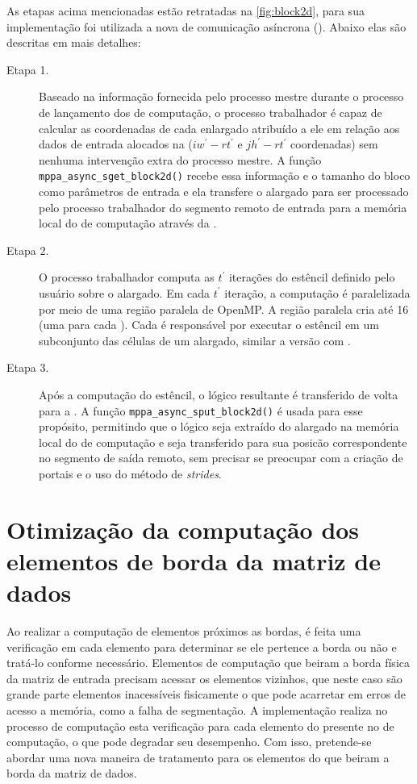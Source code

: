 As etapas acima mencionadas estão retratadas na \autoref{fig:block2d}, para sua implementação foi utilizada a nova \api de comunicação asíncrona (\async). Abaixo elas são descritas em mais detalhes:

\begin{description}

	\item[Etapa 1.] Baseado na informação fornecida pelo processo mestre durante o processo de lançamento dos \clusters de computação, o processo trabalhador é capaz de calcular as coordenadas de cada \tile enlargado atribuído a ele em relação aos dados de entrada alocados na \lpddr ($iw^\prime - rt^\prime$ e $jh^\prime - rt^\prime$ coordenadas) sem nenhuma intervenção extra do processo mestre. A função \texttt{mppa\_async\_sget\_block2d()} recebe essa informação e o tamanho do bloco como parâmetros de entrada e ela transfere o \tile alargado para ser processado pelo processo trabalhador do segmento remoto de entrada para a memória local do \cluster de computação através da \noc.

	\item[Etapa 2.] O processo trabalhador computa as $t^\prime$ iterações do  estêncil definido pelo usuário sobre o \tile alargado. Em cada $t^\prime$ iteração, a computação é paralelizada por meio de uma região paralela de OpenMP. A região paralela cria até 16 \threads (uma para cada \pe). Cada \pe é responsável por executar o  estêncil em um subconjunto das células de um \tile alargado, similar a versão com \ipc.

	\item[Etapa 3.] Após a computação do  estêncil, o \tile lógico resultante é transferido de volta para a \lpddr. A função \texttt{mppa\_async\_sput\_block2d()} é usada para esse propósito, permitindo que o \tile lógico seja extraído do \tile alargado na memória local do \cluster de computação e seja transferido para sua posicão correspondente no segmento de saída remoto, sem precisar se preocupar com a criação de portais e o uso do método de \textit{strides}.

\end{description}

\section{Otimização da computação dos elementos de borda da matriz de dados}
\label{sec:otimizacao-bordas}

Ao realizar a computação de elementos próximos as bordas, é feita uma verificação em cada elemento para determinar se ele pertence a borda ou não e tratá-lo conforme necessário. Elementos de computação que beiram a borda física da matriz de entrada precisam acessar os elementos vizinhos, que neste caso são grande parte elementos inacessíveis fisicamente o que pode acarretar em erros de acesso a memória, como a falha de segmentação. A implementação \ipc realiza no processo de computação esta verificação para cada elemento do \tile presente no \cluster de computação, o que pode degradar seu desempenho. Com isso, pretende-se abordar uma nova maneira de tratamento para os elementos do \tile que beiram a borda da matriz de dados. 

